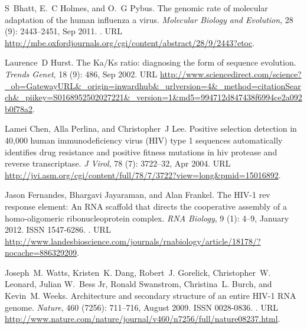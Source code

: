 \documentclass[11pt]{article}
\begin{document}
\begin{thebibliography}{48}
S~Bhatt, E.~C Holmes, and O.~G Pybus.
\newblock The genomic rate of molecular adaptation of the human influenza a
  virus.
\newblock \emph{Molecular Biology and Evolution}, 28 (9):
  2443--2451, Sep 2011.
\newblock {}.
\newblock URL
  \url{http://mbe.oxfordjournals.org/cgi/content/abstract/28/9/2443?etoc}.

Laurence~D Hurst.
\newblock The {Ka/Ks} ratio: diagnosing the form of sequence evolution.
\newblock \emph{Trends Genet}, 18 (9): 486, Sep 2002.
\newblock URL
  \url{http://www.sciencedirect.com/science?_ob=GatewayURL&_origin=inwardhub&_urlversion=4&_method=citationSearch&_piikey=S0168952502027221&_version=1&md5=994712d847438f6994ce2a092b0f78a2}.

Lamei Chen, Alla Perlina, and Christopher~J Lee.
\newblock Positive selection detection in 40,000 human immunodeficiency virus
  ({HIV}) type 1 sequences automatically identifies drug resistance and
  positive fitness mutations in hiv protease and reverse transcriptase.
\newblock \emph{J Virol}, 78 (7): 3722--32, Apr 2004.
\newblock URL
  \url{http://jvi.asm.org/cgi/content/full/78/7/3722?view=long&pmid=15016892}.

Jason Fernandes, Bhargavi Jayaraman, and Alan Frankel.
\newblock The {HIV-1} rev response element: An {RNA} scaffold that directs the
  cooperative assembly of a homo-oligomeric ribonucleoprotein complex.
\newblock \emph{{RNA} Biology}, 9 (1): 4--9, January 2012.
\newblock ISSN 1547-6286.
\newblock {}.
\newblock URL
  \url{http://www.landesbioscience.com/journals/rnabiology/article/18178/?nocache=886329209}.

Joseph~M. Watts, Kristen~K. Dang, Robert~J. Gorelick, Christopher~W. Leonard,
  Julian W.~Bess Jr, Ronald Swanstrom, Christina~L. Burch, and Kevin~M. Weeks.
\newblock Architecture and secondary structure of an entire {HIV-1} {RNA}
  genome.
\newblock \emph{Nature}, 460 (7256): 711--716, August 2009.
\newblock ISSN 0028-0836.
\newblock {}.
\newblock URL
  \url{http://www.nature.com/nature/journal/v460/n7256/full/nature08237.html}.


\end{thebibliography}
\end{document}
